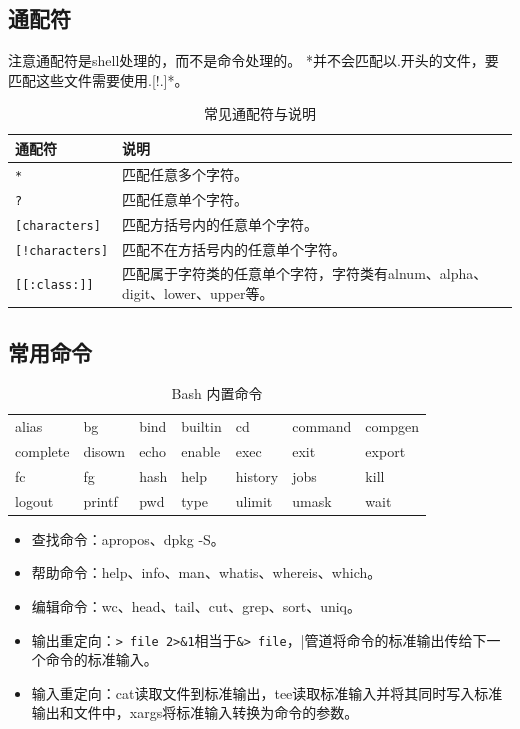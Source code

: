 \subsection{通配符}
注意通配符是shell处理的，而不是命令处理的。
*并不会匹配以.开头的文件，要匹配这些文件需要使用.[!.]*。
\begin{table}[H]
	\centering
	\begin{tabular}{|l|p{7cm}|}
		\hline
		\textbf{通配符}           & \textbf{说明}                                        \\
		\hline
		\texttt{*}             & 匹配任意多个字符。                                          \\
		\hline
		\texttt{?}             & 匹配任意单个字符。                                          \\
		\hline
		\texttt{[characters]}  & 匹配方括号内的任意单个字符。                                     \\
		\hline
		\texttt{[!characters]} & 匹配不在方括号内的任意单个字符。                                   \\
		\hline
		\texttt{[[:class:]]}   & 匹配属于字符类的任意单个字符，字符类有alnum、alpha、digit、lower、upper等。 \\
		\hline
	\end{tabular}
	\caption{常见通配符与说明}
\end{table}

\subsection{常用命令}
\begin{table}[H]
	\centering
	\begin{tabular}{lllllll}
		alias    & bg     & bind & builtin & cd      & command & compgen \\
		complete & disown & echo & enable  & exec    & exit    & export  \\
		fc       & fg     & hash & help    & history & jobs    & kill    \\
		logout   & printf & pwd  & type    & ulimit  & umask   & wait    \\
	\end{tabular}
	\caption{Bash 内置命令}
\end{table}

\begin{itemize}
	\item 查找命令：apropos、dpkg -S。
	\item 帮助命令：help、info、man、whatis、whereis、which。
	\item 编辑命令：wc、head、tail、cut、grep、sort、uniq。
	\item 输出重定向：\verb|> file 2>&1|相当于\verb|&> file|，|管道将命令的标准输出传给下一个命令的标准输入。
	\item 输入重定向：cat读取文件到标准输出，tee读取标准输入并将其同时写入标准输出和文件中，xargs将标准输入转换为命令的参数。
\end{itemize}

